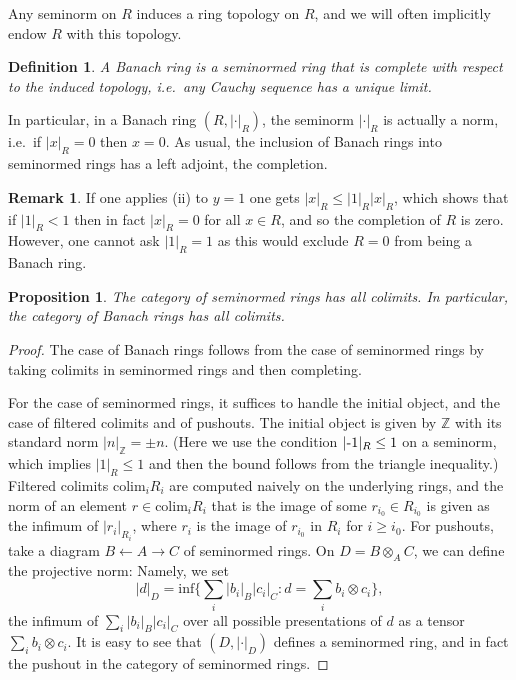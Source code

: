 \documentclass[11pt]{amsart}
\numberwithin{equation}{section}
\numberwithin{theorem}{section}
\newtheorem{proposition}[theorem]{Proposition}
\newtheorem{definition}[theorem]{Definition}
\theoremstyle{definition}
\newtheorem{remark}[theorem]{Remark}
\begin{document}
Any seminorm on $R$ induces a ring topology on $R$, and we will often implicitly endow $R$ with this topology.

\begin{definition} A Banach ring is a seminormed ring that is complete with respect to the induced topology, i.e.~any Cauchy sequence has a unique limit.
\end{definition}

In particular, in a Banach ring $(R,|\cdot|_R)$, the seminorm $|\cdot|_R$ is actually a norm, i.e.~if $|x|_R=0$ then $x=0$. As usual, the inclusion of Banach rings into seminormed rings has a left adjoint, the completion.

\begin{remark} If one applies (ii) to $y=1$ one gets $|x|_R\leq |1|_R |x|_R$, which shows that if $|1|_R<1$ then in fact $|x|_R=0$ for all $x\in R$, and so the completion of $R$ is zero. However, one cannot ask $|1|_R=1$ as this would exclude $R=0$ from being a Banach ring.
\end{remark}

\begin{proposition} The category of seminormed rings has all colimits. In particular, the category of Banach rings has all colimits.
\end{proposition}

\begin{proof} The case of Banach rings follows from the case of seminormed rings by taking colimits in seminormed rings and then completing.

For the case of seminormed rings, it suffices to handle the initial object, and the case of filtered colimits and of pushouts. The initial object is given by $\mathbb Z$ with its standard norm $|n|_{\mathbb Z}=\pm n$. (Here we use the condition $|\text-1|_R\leq 1$ on a seminorm, which implies $|1|_R\leq 1$ and then the bound follows from the triangle inequality.) Filtered colimits $\mathrm{colim}_i R_i$ are computed naively on the underlying rings, and the norm of an element $r\in \mathrm{colim}_i R_i$ that is the image of some $r_{i_0}\in R_{i_0}$ is given as the infimum of $|r_i|_{R_i}$, where $r_i$ is the image of $r_{i_0}$ in $R_i$ for $i\geq i_0$. For pushouts, take a diagram $B\leftarrow A\to C$ of seminormed rings. On $D=B\otimes_A C$, we can define the projective norm: Namely, we set
\[
|d|_D = \mathrm{inf}\{\sum_i |b_i|_B|c_i|_C : d = \sum_i b_i\otimes c_i\},
\]
the infimum of $\sum_i |b_i|_B|c_i|_C$ over all possible presentations of $d$ as a tensor $\sum_i b_i\otimes c_i$. It is easy to see that $(D,|\cdot|_D)$ defines a seminormed ring, and in fact the pushout in the category of seminormed rings.
\end{proof}
\end{document}
